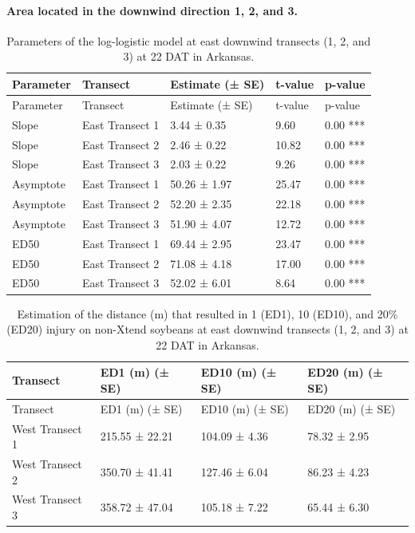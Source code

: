 \documentclass[]{article}
\let\oldparagraph\paragraph
\renewcommand{\paragraph}[1]{\oldparagraph{#1}\mbox{}}
\begin{document}
\pagebreak
\newpage

\paragraph{\texorpdfstring{Area located in the \textbf{downwind}
direction 1, 2, and
3.}{Area located in the downwind direction 1, 2, and 3.}}\label{area-located-in-the-downwind-direction-1-2-and-3.}

\begin{longtable}[]{@{}lllll@{}}
\caption{Parameters of the log-logistic model at east downwind transects
(1, 2, and 3) at 22 DAT in Arkansas.}\tabularnewline
\toprule
Parameter & Transect & Estimate (± SE) & t-value &
p-value\tabularnewline
\midrule
\endfirsthead
\toprule
Parameter & Transect & Estimate (± SE) & t-value &
p-value\tabularnewline
\midrule
\endhead
Slope & East Transect 1 & 3.44 ± 0.35 & 9.60 & 0.00 ***\tabularnewline
Slope & East Transect 2 & 2.46 ± 0.22 & 10.82 & 0.00 ***\tabularnewline
Slope & East Transect 3 & 2.03 ± 0.22 & 9.26 & 0.00 ***\tabularnewline
Asymptote & East Transect 1 & 50.26 ± 1.97 & 25.47 & 0.00
***\tabularnewline
Asymptote & East Transect 2 & 52.20 ± 2.35 & 22.18 & 0.00
***\tabularnewline
Asymptote & East Transect 3 & 51.90 ± 4.07 & 12.72 & 0.00
***\tabularnewline
ED50 & East Transect 1 & 69.44 ± 2.95 & 23.47 & 0.00 ***\tabularnewline
ED50 & East Transect 2 & 71.08 ± 4.18 & 17.00 & 0.00 ***\tabularnewline
ED50 & East Transect 3 & 52.02 ± 6.01 & 8.64 & 0.00 ***\tabularnewline
\bottomrule
\end{longtable}

\begin{longtable}[]{@{}llll@{}}
\caption{Estimation of the distance (m) that resulted in 1 (ED1), 10
(ED10), and 20\% (ED20) injury on non-Xtend soybeans at east downwind
transects (1, 2, and 3) at 22 DAT in Arkansas.}\tabularnewline
\toprule
Transect & ED1 (m) (± SE) & ED10 (m) (± SE) & ED20 (m) (±
SE)\tabularnewline
\midrule
\endfirsthead
\toprule
Transect & ED1 (m) (± SE) & ED10 (m) (± SE) & ED20 (m) (±
SE)\tabularnewline
\midrule
\endhead
West Transect 1 & 215.55 ± 22.21 & 104.09 ± 4.36 & 78.32 ±
2.95\tabularnewline
West Transect 2 & 350.70 ± 41.41 & 127.46 ± 6.04 & 86.23 ±
4.23\tabularnewline
West Transect 3 & 358.72 ± 47.04 & 105.18 ± 7.22 & 65.44 ±
6.30\tabularnewline
\bottomrule
\end{longtable}
\end{document}
